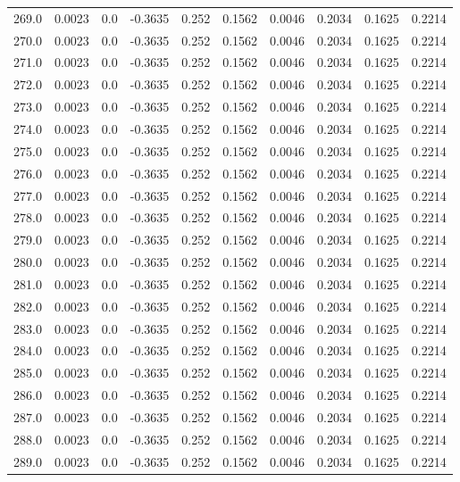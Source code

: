\begin{longtable}{lrrrrrrrrr}
269.0 & 0.0023 & 0.0 & -0.3635 & 0.252 & 0.1562 & 0.0046 & 0.2034 & 0.1625 & 0.2214 \\
270.0 & 0.0023 & 0.0 & -0.3635 & 0.252 & 0.1562 & 0.0046 & 0.2034 & 0.1625 & 0.2214 \\
271.0 & 0.0023 & 0.0 & -0.3635 & 0.252 & 0.1562 & 0.0046 & 0.2034 & 0.1625 & 0.2214 \\
272.0 & 0.0023 & 0.0 & -0.3635 & 0.252 & 0.1562 & 0.0046 & 0.2034 & 0.1625 & 0.2214 \\
273.0 & 0.0023 & 0.0 & -0.3635 & 0.252 & 0.1562 & 0.0046 & 0.2034 & 0.1625 & 0.2214 \\
274.0 & 0.0023 & 0.0 & -0.3635 & 0.252 & 0.1562 & 0.0046 & 0.2034 & 0.1625 & 0.2214 \\
275.0 & 0.0023 & 0.0 & -0.3635 & 0.252 & 0.1562 & 0.0046 & 0.2034 & 0.1625 & 0.2214 \\
276.0 & 0.0023 & 0.0 & -0.3635 & 0.252 & 0.1562 & 0.0046 & 0.2034 & 0.1625 & 0.2214 \\
277.0 & 0.0023 & 0.0 & -0.3635 & 0.252 & 0.1562 & 0.0046 & 0.2034 & 0.1625 & 0.2214 \\
278.0 & 0.0023 & 0.0 & -0.3635 & 0.252 & 0.1562 & 0.0046 & 0.2034 & 0.1625 & 0.2214 \\
279.0 & 0.0023 & 0.0 & -0.3635 & 0.252 & 0.1562 & 0.0046 & 0.2034 & 0.1625 & 0.2214 \\
280.0 & 0.0023 & 0.0 & -0.3635 & 0.252 & 0.1562 & 0.0046 & 0.2034 & 0.1625 & 0.2214 \\
281.0 & 0.0023 & 0.0 & -0.3635 & 0.252 & 0.1562 & 0.0046 & 0.2034 & 0.1625 & 0.2214 \\
282.0 & 0.0023 & 0.0 & -0.3635 & 0.252 & 0.1562 & 0.0046 & 0.2034 & 0.1625 & 0.2214 \\
283.0 & 0.0023 & 0.0 & -0.3635 & 0.252 & 0.1562 & 0.0046 & 0.2034 & 0.1625 & 0.2214 \\
284.0 & 0.0023 & 0.0 & -0.3635 & 0.252 & 0.1562 & 0.0046 & 0.2034 & 0.1625 & 0.2214 \\
285.0 & 0.0023 & 0.0 & -0.3635 & 0.252 & 0.1562 & 0.0046 & 0.2034 & 0.1625 & 0.2214 \\
286.0 & 0.0023 & 0.0 & -0.3635 & 0.252 & 0.1562 & 0.0046 & 0.2034 & 0.1625 & 0.2214 \\
287.0 & 0.0023 & 0.0 & -0.3635 & 0.252 & 0.1562 & 0.0046 & 0.2034 & 0.1625 & 0.2214 \\
288.0 & 0.0023 & 0.0 & -0.3635 & 0.252 & 0.1562 & 0.0046 & 0.2034 & 0.1625 & 0.2214 \\
289.0 & 0.0023 & 0.0 & -0.3635 & 0.252 & 0.1562 & 0.0046 & 0.2034 & 0.1625 & 0.2214 \\

\end{longtable}
